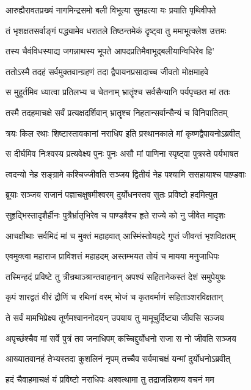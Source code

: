 \twolineshloka
{आरुह्यैरावतप्रख्यं नागमिन्द्रसमो बली}
{विभूत्या सुमहत्या यः प्रयाति पृथिवीपते}


\twolineshloka
{तं भृशक्षतसर्वाङ्गं पद्ध्यामेव धरातले}
{तिष्ठन्तमेकं दृष्ट्वा तु ममाभूत्क्लेश उत्तमः}


\twolineshloka
{तस्य चैवंविधस्याद्य जगन्नाथस्य भूपते}
{आपदप्रतिमैवाभूद्बलीयान्विधिरेव हि'}


\twolineshloka
{ततोऽस्मै तदहं सर्वमुक्तवान्ग्रहणं तदा}
{द्वैपायनप्रसादाच्च जीवतो मोक्षमाहवे}


\twolineshloka
{स मुहूर्तमिव ध्यात्वा प्रतिलभ्य च चेतनाम्}
{भ्रातॄंश्च सर्वसैन्यानि पर्यपृच्छत मां ततः}


\twolineshloka
{तस्मै तदहमाचक्षे सर्वं प्रत्यक्षदर्शिवान्}
{भ्रातॄश्च निहतान्सर्वान्सैन्यं च विनिपातितम्}


\twolineshloka
{त्रयः किल रथाः शिष्टास्तावकानां नराधिप}
{इति प्रस्थानकाले मां कृष्णद्वैपायनोऽब्रवीत्}


\twolineshloka
{स दीर्घमिव निःश्वस्य प्रत्यवेक्ष्य पुनः पुनः}
{असौ मां पाणिना स्पृष्ट्वा पुत्रस्ते पर्यभाषत}


\twolineshloka
{त्वदन्यो नेह सङ्ग्रामे कश्चिज्जीवति सञ्जय}
{द्वितीयं नेह पश्यामि ससहायाश्च पाण़्डवाः}


\twolineshloka
{ब्रूयाः सञ्जय राजानं पज्ञाचक्षुषमीश्वरम्}
{दुर्योधनस्तव सुतः प्रविष्टो हदमित्युत}


\twolineshloka
{सुहृद्भिस्तादृशैर्हीनः पुत्रैर्भ्रातृभिरेव च}
{पाण्डवैश्च हृते राज्ये को नु जीवेत मादृशः}


\twolineshloka
{आचक्षीथाः सर्वमिदं मां च मुक्तं महाहवात्}
{आस्मिंस्तोयहदे गुप्तं जीवन्तं भृशविक्षतम्}


\twolineshloka
{एवमुक्त्वा महाराज प्राविशत्तं महाहदम्}
{अस्तम्भयत तोयं च मायया मनुजाधिपः}


\twolineshloka
{तस्मिन्हदं प्रविष्टे तु त्रीन्रथाञ्श्रान्तवाहनान्}
{अपश्यं सहितानेकस्तं देशं समुपेयुषः}


\twolineshloka
{कृपं शारद्वतं वीरं द्रौणिं च रथिनां वरम्}
{भोजं च कृतवर्माणं सहिताञ्शरविक्षतान्}


\twolineshloka
{ते सर्वं मामभिप्रेक्ष्य तूर्णमश्वाननोदयन्}
{उपयाय तु मामूचुर्दिष्ट्या जीवसि सञ्जय}


\twolineshloka
{अपृच्छंश्चैव मां सर्वे पुत्रं तव जनाधिपम्}
{कच्चिद्दुर्योधनो राजा स नो जीवति सञ्जय}


\twolineshloka
{आख्यातवानहं तेभ्यस्तदा कुशलिनं नृपम्}
{तच्चैव सर्वमाचक्षं यन्मां दुर्योधनोऽब्रवीत्}


\twolineshloka
{हदं चैवाहमाचक्षं यं प्रविष्टो नराधिपः}
{अश्वत्थामा तु तद्राजन्निशम्य वचनं मम}


